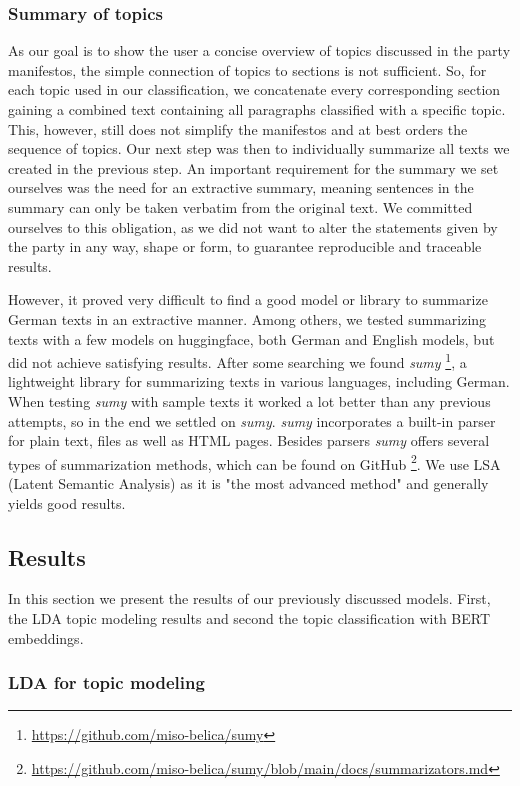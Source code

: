 \subsubsection{Summary of topics}\label{sec:summary}
As our goal is to show the user a concise overview of topics discussed in the party manifestos, the simple connection of topics to sections is not sufficient. So, for each topic used in our classification, we concatenate every corresponding section gaining a combined text containing all paragraphs classified with a specific topic. This, however, still does not simplify the manifestos and at best orders the sequence of topics. Our next step was then to individually summarize all texts we created in the previous step.
An important requirement for the summary we set ourselves was the need for an extractive summary, meaning sentences in the summary can only be taken verbatim from the original text. We committed ourselves to this obligation, as we did not want to alter the statements given by the party in any way, shape or form, to guarantee reproducible and traceable results.

However, it proved very difficult to find a good model or library to summarize German texts in an extractive manner. Among others, we tested summarizing texts with a few models on huggingface, both German and English models, but did not achieve satisfying results.
After some searching we found \textit{sumy} \footnote{\url{https://github.com/miso-belica/sumy}}, a lightweight library for summarizing texts in various languages, including German. When testing \textit{sumy} with sample texts it worked a lot better than any previous attempts, so in the end we settled on \textit{sumy}. \textit{sumy} incorporates a built-in parser for plain text, files as well as HTML pages. Besides parsers \textit{sumy} offers several types of summarization methods, which can be found on GitHub \footnote{\url{https://github.com/miso-belica/sumy/blob/main/docs/summarizators.md}}. We use LSA (Latent Semantic Analysis) as it is "the most advanced method" and generally yields good results.

\subsection{Results}
In this section we present the results of our previously discussed models. First, the LDA topic modeling results and second the topic classification with BERT embeddings.
\subsubsection{LDA for topic modeling}\label{sec:lda_results}

